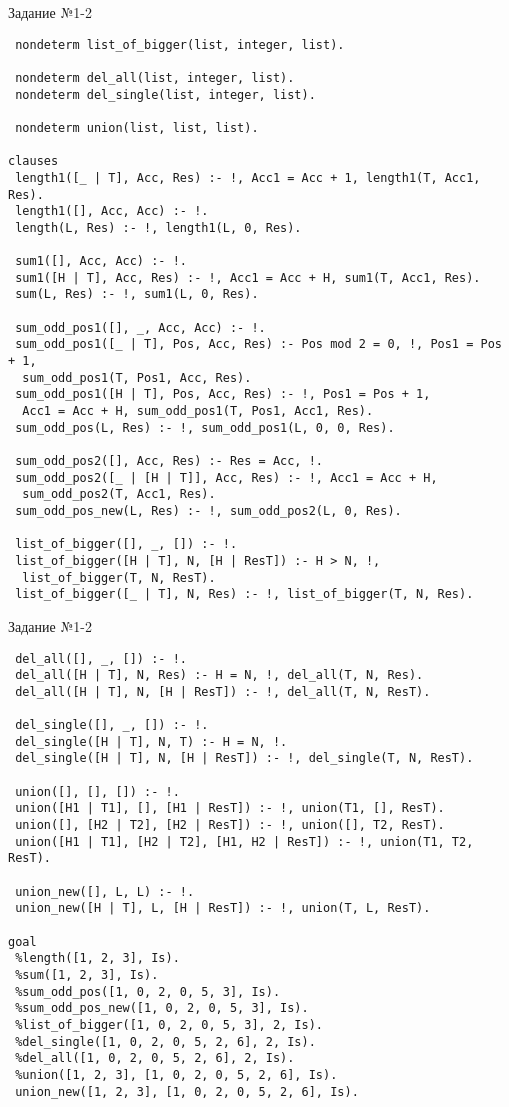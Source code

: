 \begin{code}
\caption{Задание №1-2}
\label{code:bf2}
\begin{verbatim}		
 nondeterm list_of_bigger(list, integer, list).
 
 nondeterm del_all(list, integer, list).
 nondeterm del_single(list, integer, list).
 
 nondeterm union(list, list, list).
 
clauses
 length1([_ | T], Acc, Res) :- !, Acc1 = Acc + 1, length1(T, Acc1, Res).
 length1([], Acc, Acc) :- !.
 length(L, Res) :- !, length1(L, 0, Res).
 
 sum1([], Acc, Acc) :- !.
 sum1([H | T], Acc, Res) :- !, Acc1 = Acc + H, sum1(T, Acc1, Res).
 sum(L, Res) :- !, sum1(L, 0, Res).
 
 sum_odd_pos1([], _, Acc, Acc) :- !.
 sum_odd_pos1([_ | T], Pos, Acc, Res) :- Pos mod 2 = 0, !, Pos1 = Pos + 1,
  sum_odd_pos1(T, Pos1, Acc, Res).
 sum_odd_pos1([H | T], Pos, Acc, Res) :- !, Pos1 = Pos + 1,
  Acc1 = Acc + H, sum_odd_pos1(T, Pos1, Acc1, Res).
 sum_odd_pos(L, Res) :- !, sum_odd_pos1(L, 0, 0, Res).
 
 sum_odd_pos2([], Acc, Res) :- Res = Acc, !.
 sum_odd_pos2([_ | [H | T]], Acc, Res) :- !, Acc1 = Acc + H,
  sum_odd_pos2(T, Acc1, Res).
 sum_odd_pos_new(L, Res) :- !, sum_odd_pos2(L, 0, Res).
 
 list_of_bigger([], _, []) :- !.
 list_of_bigger([H | T], N, [H | ResT]) :- H > N, !,
  list_of_bigger(T, N, ResT).
 list_of_bigger([_ | T], N, Res) :- !, list_of_bigger(T, N, Res).
\end{verbatim}
\end{code}

\newpage

\begin{code}
\caption{Задание №1-2}
\label{code:bf3}
\begin{verbatim}
 del_all([], _, []) :- !.
 del_all([H | T], N, Res) :- H = N, !, del_all(T, N, Res).
 del_all([H | T], N, [H | ResT]) :- !, del_all(T, N, ResT).
 
 del_single([], _, []) :- !.
 del_single([H | T], N, T) :- H = N, !.
 del_single([H | T], N, [H | ResT]) :- !, del_single(T, N, ResT).
 
 union([], [], []) :- !.
 union([H1 | T1], [], [H1 | ResT]) :- !, union(T1, [], ResT).
 union([], [H2 | T2], [H2 | ResT]) :- !, union([], T2, ResT).
 union([H1 | T1], [H2 | T2], [H1, H2 | ResT]) :- !, union(T1, T2, ResT).
 
 union_new([], L, L) :- !.
 union_new([H | T], L, [H | ResT]) :- !, union(T, L, ResT).

goal
 %length([1, 2, 3], Is).
 %sum([1, 2, 3], Is).
 %sum_odd_pos([1, 0, 2, 0, 5, 3], Is).
 %sum_odd_pos_new([1, 0, 2, 0, 5, 3], Is).
 %list_of_bigger([1, 0, 2, 0, 5, 3], 2, Is).
 %del_single([1, 0, 2, 0, 5, 2, 6], 2, Is).
 %del_all([1, 0, 2, 0, 5, 2, 6], 2, Is).
 %union([1, 2, 3], [1, 0, 2, 0, 5, 2, 6], Is).
 union_new([1, 2, 3], [1, 0, 2, 0, 5, 2, 6], Is).
\end{verbatim}
\end{code}

